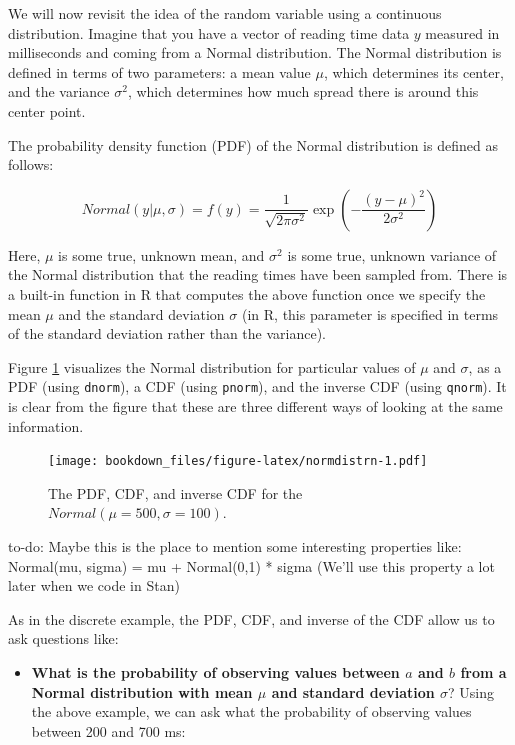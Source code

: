 \documentclass[12pt,]{krantz}
\makeatletter
\providecommand{\tightlist}{%
  \setlength{\itemsep}{0pt}\setlength{\parskip}{0pt}}
\newenvironment{kframe}{%
\medskip{}
\setlength{\fboxsep}{.8em}
 \def\at@end@of@kframe{}%
 \ifinner\ifhmode%
  \def\at@end@of@kframe{\end{minipage}}%
  \begin{minipage}{\columnwidth}%
 \fi\fi%
 \def\FrameCommand##1{\hskip\@totalleftmargin \hskip-\fboxsep
 \colorbox{shadecolor}{##1}\hskip-\fboxsep
     \hskip-\linewidth \hskip-\@totalleftmargin \hskip\columnwidth}%
 \MakeFramed {\advance\hsize-\width
   \@totalleftmargin\z@ \linewidth\hsize
   \@setminipage}}%
 {\par\unskip\endMakeFramed%
 \at@end@of@kframe}
\newenvironment{rmdblock}[1]
  {
  \begin{itemize}
  \renewcommand{\labelitemi}{
    \raisebox{-.7\height}[0pt][0pt]{
      {\setkeys{Gin}{width=3em,keepaspectratio}\texttt{[image: images/\#1]}}
    }
  }
  \setlength{\fboxsep}{1em}
  \begin{kframe}
  \item
  }
  {
  \end{kframe}
  \end{itemize}
  }
\newenvironment{rmdnote}
  {\begin{rmdblock}{note}}
  {\end{rmdblock}}
\theoremstyle{definition}
\theoremstyle{definition}
\theoremstyle{definition}
\theoremstyle{remark}
\makeatother
\begin{document}
We will now revisit the idea of the random variable using a continuous
distribution. Imagine that you have a vector of reading time data \(y\)
measured in milliseconds and coming from a Normal distribution. The
Normal distribution is defined in terms of two parameters: a mean value
\(\mu\), which determines its center, and the variance \(\sigma^2\),
which determines how much spread there is around this center point.

The probability density function (PDF) of the Normal distribution is
defined as follows:

\begin{equation}
Normal(y|\mu,\sigma)=f(y)= \frac{1}{\sqrt{2\pi \sigma^2}} \exp \left(-\frac{(y-\mu)^2}{2\sigma^2} \right)
\end{equation}

Here, \(\mu\) is some true, unknown mean, and \(\sigma^2\) is some true,
unknown variance of the Normal distribution that the reading times have
been sampled from. There is a built-in function in R that computes the
above function once we specify the mean \(\mu\) and the standard
deviation \(\sigma\) (in R, this parameter is specified in terms of the
standard deviation rather than the variance).

Figure \ref{fig:normdistrn} visualizes the Normal distribution for
particular values of \(\mu\) and \(\sigma\), as a PDF (using
\texttt{dnorm}), a CDF (using \texttt{pnorm}), and the inverse CDF
(using \texttt{qnorm}). It is clear from the figure that these are three
different ways of looking at the same information.

\begin{figure}
\centering
\texttt{[image: bookdown\_files/figure-latex/normdistrn-1.pdf]}
\caption{\label{fig:normdistrn}The PDF, CDF, and inverse CDF for the
\(Normal(\mu=500,\sigma=100)\).}
\end{figure}

\begin{rmdnote} to-do: Maybe this is the place to mention some
interesting properties like: Normal(mu, sigma) = mu + Normal(0,1) *
sigma (We'll use this property a lot later when we code in Stan)
\end{rmdnote}

As in the discrete example, the PDF, CDF, and inverse of the CDF allow
us to ask questions like:

\begin{itemize}
\tightlist
\item
  \textbf{What is the probability of observing values between \(a\) and
  \(b\) from a Normal distribution with mean \(\mu\) and standard
  deviation \(\sigma\)}? Using the above example, we can ask what the
  probability of observing values between 200 and 700 ms:
\end{itemize}
\end{document}

